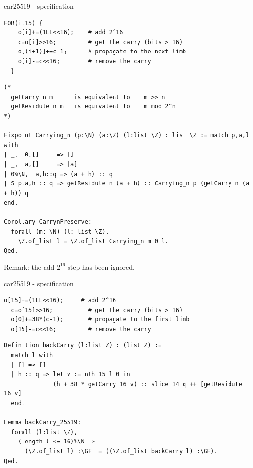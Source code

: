 \documentclass[8pt]{beamer}
\begin{document}
\begin{frame}[fragile]{car25519 - specification}
  \begin{center}

\begin{lstlisting}[language=cnacl, caption=car25519 | propagation, label=cod:languageC151]
  FOR(i,15) {
    o[i]+=(1LL<<16);    # add 2^16
    c=o[i]>>16;         # get the carry (bits > 16)
    o[(i+1)]+=c-1;      # propagate to the next limb
    o[i]-=c<<16;        # remove the carry
  }
\end{lstlisting}

\begin{lstlisting}[language=Coq, caption=car25519 | Proofs of correctness, label=cod:languageC152]
(*
  getCarry n m      is equivalent to    m >> n
  getResidute n m   is equivalent to    m mod 2^n
*)

Fixpoint Carrying_n (p:\N) (a:\Z) (l:list \Z) : list \Z := match p,a,l with
| _,  0,[]     => []
| _,  a,[]     => [a]
| 0%\N,  a,h::q => (a + h) :: q
| S p,a,h :: q => getResidute n (a + h) :: Carrying_n p (getCarry n (a + h)) q
end.

Corollary CarrynPreserve:
  forall (m: \N) (l: list \Z),
    \Z.of_list l = \Z.of_list Carrying_n m 0 l.
Qed.
\end{lstlisting}

Remark: the add $2^{16}$ step has been ignored.
  \end{center}
\end{frame}


%
%

\begin{frame}[fragile]{car25519 - specification}
  \begin{center}

\begin{lstlisting}[language=cnacl, caption=car25519 | back, label=cod:languageC161]
  o[15]+=(1LL<<16);     # add 2^16
  c=o[15]>>16;          # get the carry (bits > 16)
  o[0]+=38*(c-1);       # propagate to the first limb
  o[15]-=c<<16;         # remove the carry
\end{lstlisting}

\begin{lstlisting}[language=Coq, caption=car25519 | Proofs of correctness, label=cod:languageC162]
Definition backCarry (l:list Z) : (list Z) :=
  match l with
  | [] => []
  | h :: q => let v := nth 15 l 0 in
              (h + 38 * getCarry 16 v) :: slice 14 q ++ [getResidute 16 v]
  end.

Lemma backCarry_25519:
  forall (l:list \Z),
    (length l <= 16)%\N ->
      (\Z.of_list l) :\GF  = ((\Z.of_list backCarry l) :\GF).
Qed.
\end{lstlisting}

  \end{center}
\end{frame}
\end{document}
